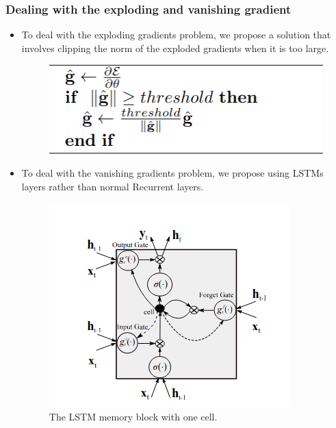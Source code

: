\documentclass[
	11pt,
]{beamer}
\begin{document}
\begin{frame}
	\frametitle{Dealing with the exploding and vanishing gradient}
	\begin{itemize}
		\item To deal with the exploding gradients problem, we propose a solution that involves clipping the norm of the exploded
		gradients when it is too large.
	\begin{figure}[h]
		\centering
		\includegraphics[scale=0.5]{gradient_clipping.png}
	\end{figure}
		\item To deal with the vanishing gradients problem, we propose using LSTMs layers rather than normal Recurrent layers.
	\begin{figure}[h]
		\centering
		\includegraphics[scale=0.45]{lstm.png}
		\caption{The LSTM memory block with one cell.}
	\end{figure}
\end{itemize}
\end{frame}



\end{document}
